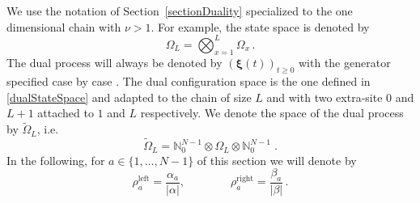 \documentclass[10pt]{article}
\numberwithin{equation}{section}
\numberwithin{equation}{subsection}
\newcommand{\dt}{\;.}
\begin{document}
We use the notation of Section~\ref{sectionDuality} specialized to the one dimensional chain with $\nu >1$.
For example, the state space is denoted by 
\begin{equation}\label{stateSpace-Chain}
	\Omega_{L}=\bigotimes_{x=1}^{L} \Omega_{x}\,.
\end{equation}
 The dual process will always be denoted by $(\bm{\xi}(t))_{t\geq 0}$ with the generator specified case by case . The dual configuration space is the one defined in \eqref{dualStateSpace} and adapted to the chain of size $L$ and with two extra-site $0$ and $L+1$ attached to $1$ and $L$ respectively. 
 We denote the space of the dual process by $\widetilde{\Omega}_{L}$, i.e.
\begin{equation}\label{dualSpace-chain}
	\widetilde{\Omega}_{L}=\mathbb{N}_{0}^{N-1}\otimes \Omega_{L}\otimes \mathbb{N}_{0}^{N-1}\dt
\end{equation}
In the following, for $a\in \{1,\ldots,N-1\}$ of this section we will denote by 
\begin{equation}
	\rho_{a}^{\text{left}}=\frac{\alpha_{a}}{|\alpha|},\qquad \qquad \rho_{a}^{\text{right}}=\frac{\beta_{a}}{|\beta|}\,.
\end{equation}
\end{document}
